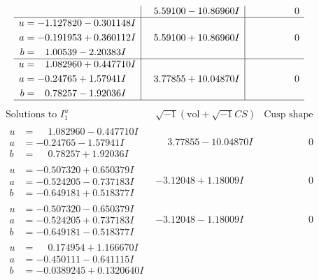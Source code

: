 \documentclass[1p]{elsarticle_modified}
\theoremstyle{definition}
\newcommand{\I}{\sqrt{-1}}
\begin{document}
$$\begin{array}{c|c|c}
 & \phantom{-}5.59100 - 10.86960 I & \phantom{-0.000000 } 0 \\ \hline\begin{aligned}
u &= -1.127820 - 0.301148 I \\
a &= -0.191953 + 0.360112 I \\
b &= \phantom{-}1.00539 - 2.20383 I\end{aligned}
 & \phantom{-}5.59100 + 10.86960 I & \phantom{-0.000000 } 0 \\ \hline\begin{aligned}
u &= \phantom{-}1.082960 + 0.447710 I \\
a &= -0.24765 + 1.57941 I \\
b &= \phantom{-}0.78257 - 1.92036 I\end{aligned}
 & \phantom{-}3.77855 + 10.04870 I & \phantom{-0.000000 } 0\\
 \hline 
 \end{array}$$\newpage$$\begin{array}{c|c|c}  
\text{Solutions to }I^u_{1}& \I (\text{vol} + \sqrt{-1}CS) & \text{Cusp shape}\\
 \hline 
\begin{aligned}
u &= \phantom{-}1.082960 - 0.447710 I \\
a &= -0.24765 - 1.57941 I \\
b &= \phantom{-}0.78257 + 1.92036 I\end{aligned}
 & \phantom{-}3.77855 - 10.04870 I & \phantom{-0.000000 } 0 \\ \hline\begin{aligned}
u &= -0.507320 + 0.650379 I \\
a &= -0.524205 - 0.737183 I \\
b &= -0.649181 + 0.518377 I\end{aligned}
 & -3.12048 + 1.18009 I & \phantom{-0.000000 } 0 \\ \hline\begin{aligned}
u &= -0.507320 - 0.650379 I \\
a &= -0.524205 + 0.737183 I \\
b &= -0.649181 - 0.518377 I\end{aligned}
 & -3.12048 - 1.18009 I & \phantom{-0.000000 } 0 \\ \hline\begin{aligned}
u &= \phantom{-}0.174954 + 1.166670 I \\
a &= -0.450111 - 0.641115 I \\
b &= -0.0389245 + 0.1320640 I\end{aligned}

\end{array}$$
\end{document}
